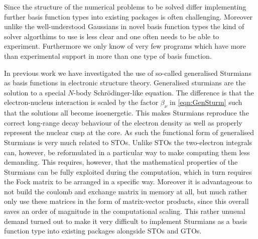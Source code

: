 Since the structure of the numerical problems to be solved differ
implementing further basis function types into existing packages
is often challenging.
Moreover unlike the well-understood Gaussians in novel basis function types
the kind of solver algorthims to use is less clear and one often needs to be able to experiment.
Furthermore we only know of very few programs which have more than experimental
support in more than one type of basis function.


In previous work we have investigated the use of so-called generalised Sturmians as basis functions
in electronic structure theory.
Generalised sturmians are the solution to a special $N$-body Schrödinger-like
equation.
The difference is that the electron-nucleus interaction is scaled by the factor
$\beta_\nu$ in \eqref{eqn:GenSturm}
such that the solutions all become isoenergetic.
This makes Sturmians reproduce the correct long-range decay behaviour of the electron density
as well as properly represent the nuclear cusp at the core.
As such the functional form of generalised Sturmians is very much related to STOs.
Unlike STOs the two-electron integrals can, however, be reformulated in a particular way
to make computing them less demanding.
This requires, however, that the mathematical properties of the Sturmians
can be fully exploited during the computation,
which in turn requires the Fock matrix to be arranged in a specific way.
Moreover it is advantageous to not build the coulomb and exchange matrix in memory at all,
but much rather only use these matrices in the form of matrix-vector products,
since this overall saves an order of magnitude in the computational scaling.
%
%
This rather unusual demand turned out to make it very difficult to implement Sturmians
as a basis function type into existing packages alongside STOs and GTOs.

